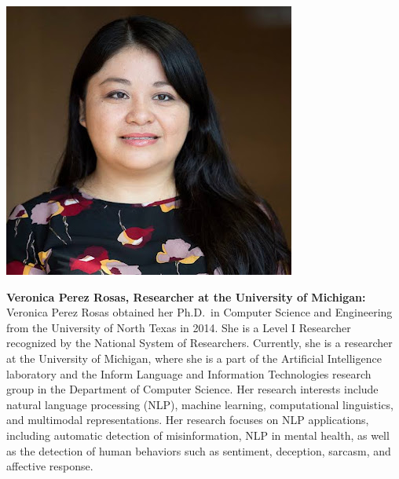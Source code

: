 \vspace{1em}
\begin{center}
\includegraphics[width=0.3\linewidth]{content/mexican_nlp/veronica.png}
\end{center}
{\bfseries Veronica Perez Rosas, Researcher at the University of Michigan:}
Veronica Perez Rosas obtained her Ph.D.~in Computer Science and Engineering from the University of North Texas in 2014. She is a Level I Researcher recognized by the National System of Researchers. Currently, she is a researcher at the University of Michigan, where she is a part of the Artificial Intelligence laboratory and the Inform Language and Information Technologies research group in the Department of Computer Science. Her research interests include natural language processing (NLP), machine learning, computational linguistics, and multimodal representations. Her research focuses on NLP applications, including automatic detection of misinformation, NLP in mental health, as well as the detection of human behaviors such as sentiment, deception, sarcasm, and affective response.

\newpage
